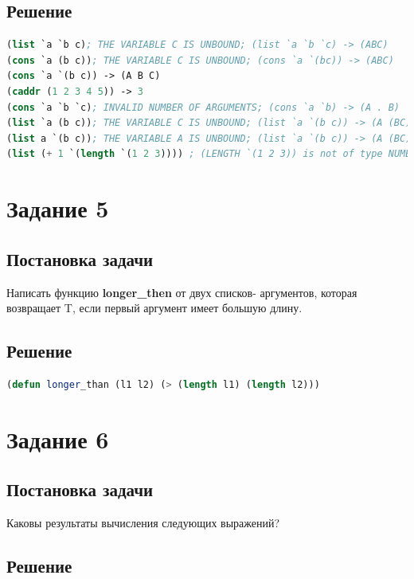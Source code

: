\documentclass[12pt]{report}
\begin{document}
\subsection*{Решение}

\begin{lstlisting}[label=4xd,caption=Решение задания №4, language=lisp]
(list `a `b c); THE VARIABLE C IS UNBOUND; (list `a `b `c) -> (ABC)
(cons `a (b c)); THE VARIABLE C IS UNBOUND; (cons `a `(bc)) -> (ABC)
(cons `a `(b c)) -> (A B C)
(caddr (1 2 3 4 5)) -> 3
(cons `a `b `c); INVALID NUMBER OF ARGUMENTS; (cons `a `b) -> (A . B)
(list `a (b c)); THE VARIABLE C IS UNBOUND; (list `a `(b c)) -> (A (BC))
(list a `(b c)); THE VARIABLE A IS UNBOUND; (list `a `(b c)) -> (A (BC))
(list (+ 1 `(length `(1 2 3)))) ; (LENGTH `(1 2 3)) is not of type NUMBER; (list (+1 (length `(123)))) -> 4
\end{lstlisting}

\section*{Задание 5}
\subsection*{Постановка задачи}
Написать функцию \textbf{longer\_then} от двух списков- аргументов, которая возвращает T, если первый аргумент имеет большую длину.

\subsection*{Решение}

\begin{lstlisting}[label=5xd,caption=Решение задания №5, language=lisp]
(defun longer_than (l1 l2) (> (length l1) (length l2)))
\end{lstlisting}

\section*{Задание 6}
\subsection*{Постановка задачи}
Каковы результаты вычисления следующих выражений? 

\subsection*{Решение}
\end{document}
